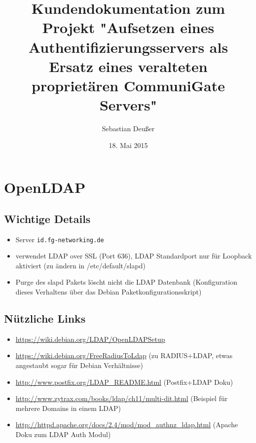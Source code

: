\documentclass[11pt,a4paper,titlepage=firstiscover,headsepline,bibtotoc]{scrartcl} %
\title{Kundendokumentation zum Projekt "Aufsetzen eines Authentifizierungsservers als Ersatz eines veralteten proprietären CommuniGate Servers"}
\author{Sebastian Deußer}
\date{18. Mai 2015} %
\begin{document}
\pagestyle{empty}


\newpage
\setcounter{page}{1}  %
\pagestyle{scrheadings}

\section{OpenLDAP}
\subsection{Wichtige Details}
\begin{itemize}
\item Server \texttt{id.fg-networking.de}
\item verwendet LDAP over SSL (Port 636), LDAP Standardport nur für Loopback aktiviert (zu ändern in /etc/default/slapd)
\item Purge des slapd Pakets löscht nicht die LDAP Datenbank (Konfiguration dieses Verhaltens über das Debian Paketkonfigurationsskript)
\end{itemize}


\subsection{Nützliche Links}
\begin{itemize}
\item \url{https://wiki.debian.org/LDAP/OpenLDAPSetup}
\item \url{https://wiki.debian.org/FreeRadiusToLdap} (zu RADIUS+LDAP, etwas angestaubt sogar für Debian Verhältnisse)
\item \url{http://www.postfix.org/LDAP_README.html} (Postfix+LDAP Doku)
\item \url{http://www.zytrax.com/books/ldap/ch11/multi-dit.html} (Beispiel für mehrere Domains in einem LDAP)
\item \url{http://httpd.apache.org/docs/2.4/mod/mod_authnz_ldap.html} (Apache Doku zum LDAP Auth Modul)
\end{itemize}
\end{document}

